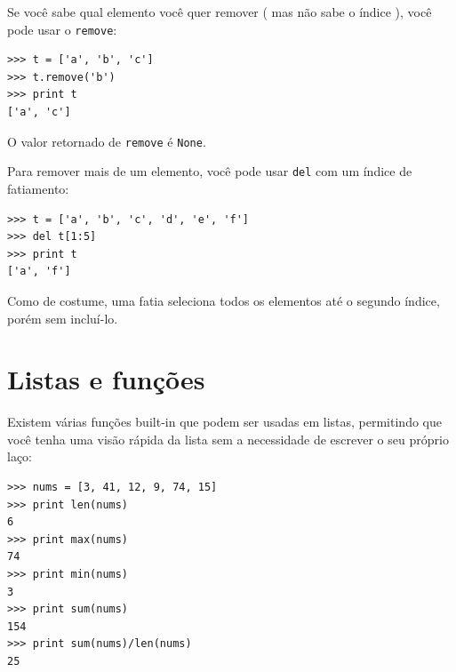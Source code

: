 Se você sabe qual elemento você quer remover ( mas não sabe o índice ), você
pode usar o {\tt remove}:


\beforeverb
\begin{verbatim}
>>> t = ['a', 'b', 'c']
>>> t.remove('b')
>>> print t
['a', 'c']
\end{verbatim}
\afterverb
%
O valor retornado de {\tt remove} é {\tt None}.


Para remover mais de um elemento, você pode usar {\tt del} com 
um índice de fatiamento:

\beforeverb
\begin{verbatim}
>>> t = ['a', 'b', 'c', 'd', 'e', 'f']
>>> del t[1:5]
>>> print t
['a', 'f']
\end{verbatim}
\afterverb
%

Como de costume, uma fatia seleciona todos os elementos até o segundo índice, porém sem incluí-lo.

\section{Listas e funções}

Existem várias funções built-in que podem ser usadas em listas,
permitindo que você tenha uma visão rápida da lista sem a necessidade de escrever 
o seu próprio laço:

\beforeverb
\begin{verbatim}
>>> nums = [3, 41, 12, 9, 74, 15]
>>> print len(nums)
6
>>> print max(nums)
74
>>> print min(nums)
3
>>> print sum(nums)
154
>>> print sum(nums)/len(nums)
25
\end{verbatim}
\afterverb
%

